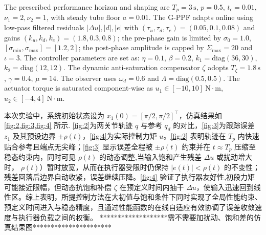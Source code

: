 \documentclass[pdflatex,sn-mathphys-num]{sn-jnl}%
\theoremstyle{thmstyleone}%
\theoremstyle{thmstyletwo}%
\theoremstyle{thmstylethree}%
\begin{document}
The prescribed performance horizon and shaping are \(T_p=3\,\mathrm{s}\), \(p=0.5\), $t_\epsilon=0.01$, $\nu_1=2, \nu_2=1$, with steady tube floor \(a=0.01\). 
The G-PPF adapts online using low-pass filtered residuals \(|\Delta u|,|d|,|e|\) with \((\tau_u,\tau_d,\tau_e)=(0.05,0.1,0.08)\) and gains \((k_u,k_d,k_e)=(1.8,0.3,0.8)\); the pre-phase gain is limited by \(\sigma_0=1.0\), \([\sigma_{\min},\sigma_{\max}]=[1.2,2]\); the post-phase amplitude is capped by \(\Sigma_{\max}=20\) and \(\iota=3\).
The controller parameters are set as: \(\eta=0.1\), \(\beta=0.2\), \(k_1=\mathrm{diag}(36,30)\), \(k_2=\mathrm{diag}(12,12)\).
The dynamic anti-saturation compensator \(\zeta\) adopts \(T_\zeta=1.8\,\mathrm{s}\), \(\gamma=0.4\), \(\mu=14\).
The observer uses \(\omega_d=0.6\) and \(\Lambda=\mathrm{diag}(0.5,0.5)\).
The actuator torque is saturated component-wise as \(u_1\in[-10,10]\ \mathrm{N\cdot m}\), \(u_2\in[-4,4]\ \mathrm{N\cdot m}\).






本次实验中，系统初始状态设为 \(x_1(0)=[\pi/2,\pi/2]^{\top}\)，仿真结果如 \cref{fig:2,fig:3,fig:4} 所示. \cref{fig:2}为两关节轨迹 \(q\) 与参考 \(q_d\) 的对比，\cref{fig:3}为跟踪误差 \(z_1\) 及其预设边界 \(\pm\rho(t)\)，\cref{fig:4}为实际控制力矩 \(u\)。\cref{fig:2} 表明轨迹在 \(T_p\) 内快速贴合参考且端点无尖峰；\cref{fig:3} 显示误差全程被 \(\pm\rho(t)\) 约束并在 \(t\approx T_p\) 压缩至稳态约束内，同时可见 \(\rho(t)\) 的动态调整,当输入饱和产生残差 \(\Delta u\) 或扰动增大时， \(\rho(t)\)）暂时放宽，从而在执行器受限时仍保持 \(|e(t)|<\rho(t)\) 的不变性；残差回落后边界自动收紧，误差继续压降。\cref{fig:4} 验证了执行器友好性,初段力矩可能接近限幅，但动态抗饱和补偿 \(\zeta\) 在预定义时间内抽干 \(\Delta u\)，使输入迅速回到线性区。综上表明，所提控制方法在大初值与饱和条件下同时实现了全局性能约束、预定义时间进入与稳态精度，且通过性能函数的在线自适应有效协调了误差收敛速度与执行器负载之间的权衡。
*******************需不需要加扰动、饱和差的仿真结果图**********************
\end{document}
